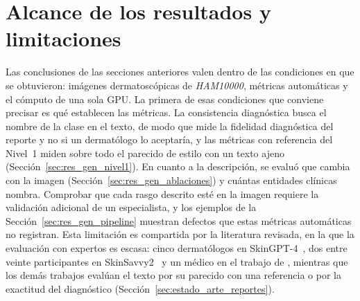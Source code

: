 \section{Alcance de los resultados y limitaciones}
\label{sec:disc_limitaciones}

Las conclusiones de las secciones anteriores valen dentro de las condiciones en que se obtuvieron: imágenes
dermatoscópicas de \emph{HAM10000}, métricas automáticas y el cómputo de una sola GPU. La primera de esas condiciones
que conviene precisar es qué establecen las métricas. La consistencia diagnóstica busca el nombre de la clase en el
texto, de modo que mide la fidelidad diagnóstica del reporte y no si un dermatólogo lo aceptaría, y las métricas con
referencia del Nivel~1 miden sobre todo el parecido de estilo con un texto ajeno (Sección~\ref{sec:res_gen_nivel1}).
En cuanto a la descripción, se evaluó que cambia con la imagen (Sección~\ref{sec:res_gen_ablaciones}) y cuántas
entidades clínicas nombra. Comprobar que cada rasgo descrito esté en la imagen requiere la validación adicional de un
especialista, y los ejemplos de la Sección~\ref{sec:res_gen_pipeline} muestran defectos que estas métricas automáticas
no registran. Esta limitación es compartida por la literatura revisada, en la que la evaluación con
expertos es escasa: cinco dermatólogos en SkinGPT-4~\cite{zhou2024pretrained}, dos entre veinte participantes en
SkinSavvy2~\cite{kim2025skinsavvy2} y un médico en el trabajo de \textcite{chakrabarti2025skin}, mientras que los
demás trabajos evalúan el texto por su parecido con una referencia o por la exactitud del diagnóstico
(Sección~\ref{sec:estado_arte_reportes}).

